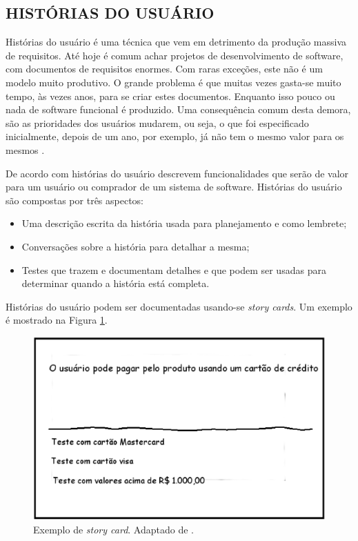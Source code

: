 \subsection{HISTÓRIAS DO USUÁRIO}
\label{user_stories_sec}

Histórias do usuário é uma técnica que vem em detrimento da produção massiva de requisitos. 
Até hoje é comum achar projetos de desenvolvimento de software, com documentos de requisitos enormes. 
Com raras exceções, este não é um modelo muito produtivo. 
O grande problema é que muitas vezes gasta-se muito tempo, às vezes anos, para se criar estes documentos. 
Enquanto isso pouco ou nada de software funcional é produzido. 
Uma consequência comum desta demora, são as prioridades dos usuários mudarem, ou seja, o que foi especificado inicialmente, depois de um ano, por exemplo, já não tem o mesmo valor para os mesmos \cite{Patton2014}.

De acordo com \cite{cohn2004} histórias do usuário descrevem funcionalidades que serão de valor para um usuário ou comprador de um sistema de software. Histórias do usuário são compostas por três aspectos: 
\begin{itemize}
	\item Uma descrição escrita da história usada para planejamento e como lembrete;
	\item Conversações sobre a história para detalhar a mesma;
	\item Testes que trazem e documentam detalhes e que podem ser usadas para determinar quando a história está completa.
\end{itemize}

Histórias do usuário podem ser documentadas usando-se \emph{story cards}. Um exemplo é mostrado na Figura \ref{story_card}.
\begin{figure}[ht]
	\centering
	\includegraphics[width=15 cm]{figuras/story_card.eps}
	\caption{Exemplo de \emph{story card}. Adaptado de \cite{cohn2004}.}
    	\label{story_card}
\end{figure}

